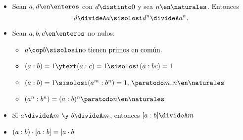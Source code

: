 \begin{itemize}
\begin{itemize}
          \item Sean $a, d \en\enteros$ con $d \distinto 0$ y sea $n \en \naturales$. Entonces
                $$
                  d \divideA a \sisolosi d^n \divideA a^n.
                $$

          \item Sean $a,b,c \en \enteros$ no nulos:
                \begin{itemize}
                  \item $a \cop b \sisolosi \text{no tienen primos en común}.$
                  \item $\mcd = 1 \ytext (a : c) = 1 \sisolosi (a : bc) = 1$
                  \item $\mcd = 1 \sisolosi (a^m: b^n) = 1 ,\, \paratodo m, n \en \naturales$
                  \item $(a^n:b^n) = (a:b)^n \paratodo n \en \naturales$
                \end{itemize}

          \item Si $a \divideA m \ \y \  b \divideA m$, entonces $[a:b] \divideA m$

          \item $(a:b) \cdot [a:b] = |a \cdot b|$
        \end{itemize}

\end{itemize}
